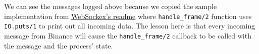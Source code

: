\documentclass[
  oneside]{book}
\newenvironment{Shaded}{\begin{snugshade}}{\end{snugshade}}
\newcommand{\AttributeTok}[1]{\textcolor[rgb]{0.13,0.29,0.53}{#1}}
\newcommand{\CommentTok}[1]{\textcolor[rgb]{0.56,0.35,0.01}{\textit{#1}}}
\newcommand{\DataTypeTok}[1]{\textcolor[rgb]{0.13,0.29,0.53}{#1}}
\newcommand{\ErrorTok}[1]{\textcolor[rgb]{0.64,0.00,0.00}{\textbf{#1}}}
\newcommand{\ExtensionTok}[1]{#1}
\newcommand{\KeywordTok}[1]{\textcolor[rgb]{0.13,0.29,0.53}{\textbf{#1}}}
\newcommand{\NormalTok}[1]{#1}
\newcommand{\OperatorTok}[1]{\textcolor[rgb]{0.81,0.36,0.00}{\textbf{#1}}}
\newcommand{\StringTok}[1]{\textcolor[rgb]{0.31,0.60,0.02}{#1}}
\begin{document}
\begin{Shaded}
\end{Shaded}

We can see the messages logged above because we copied the sample implementation from \href{https://github.com/Azolo/websockex}{WebSockex's readme} where \texttt{handle\_frame/2} function uses \texttt{IO.puts/1} to print out all incoming data. The lesson here is that every incoming message from Binance will cause the \texttt{handle\_frame/2} callback to be called with the message and the process' state.
\end{document}
